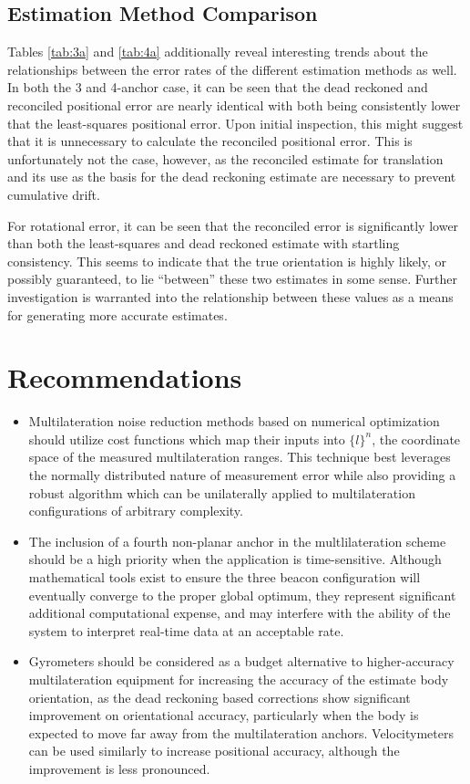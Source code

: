 \documentclass{report}
\begin{document}
			\subsection{Estimation Method Comparison}
				Tables \ref{tab:3a} and \ref{tab:4a} additionally reveal interesting trends about the relationships between the error rates of the different estimation methods as well. In both the 3 and 4-anchor case, it can be seen that the dead reckoned and reconciled positional error are nearly identical with both being consistently lower that the least-squares positional error. Upon initial inspection, this might suggest that it is unnecessary to calculate the reconciled positional error. This is unfortunately not the case, however, as the reconciled estimate for translation and its use as the basis for the dead reckoning estimate are necessary to prevent cumulative drift.\par
				For rotational error, it can be seen that the reconciled error is significantly lower than both the least-squares and dead reckoned estimate with startling consistency. This seems to indicate that the true orientation is highly likely, or possibly guaranteed, to lie ``between'' these two estimates in some sense. Further investigation is warranted into the relationship between these values as a means for generating more accurate estimates.
				
\newpage
				
		\section{Recommendations}
			\begin{itemize}[wide, labelwidth=!, labelindent=0pt, label={\bf\textendash}]
				\item Multilateration noise reduction methods based on numerical optimization should utilize cost functions which map their inputs into $\{l\}^n$, the coordinate space of the measured multilateration ranges. This technique best leverages the normally distributed nature of measurement error while also providing a robust algorithm which can be unilaterally applied to multilateration configurations of arbitrary complexity.
				\item The inclusion of a fourth non-planar anchor in the multlilateration scheme should be a high priority when the application is time-sensitive. Although mathematical tools exist to ensure the three beacon configuration will eventually converge to the proper global optimum, they represent significant additional computational expense, and may interfere with the ability of the system to interpret real-time data at an acceptable rate.
				\item Gyrometers should be considered as a budget alternative to higher-accuracy multilateration equipment for increasing the accuracy of the estimate body orientation, as the dead reckoning based corrections show significant improvement on orientational accuracy, particularly when the body is expected to move far away from the multilateration anchors. Velocitymeters can be used similarly to increase positional accuracy, although the improvement is less pronounced.
			\end{itemize}
\end{document}

